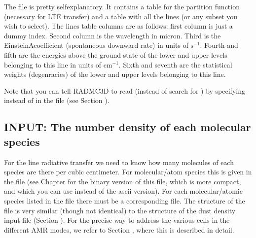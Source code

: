 \documentclass[letterpaper,10pt,english]{sphinxmanual}
\begin{document}
The file is pretty self\sphinxhyphen{}explanatory. It contains a table for the partition
function (necessary for LTE transfer) and a table with all the lines (or any
subset you wish to select). The lines table columns are as follows: first column
is just a dummy index. Second column is the wavelength in micron. Third is the
Einstein\sphinxhyphen{}A\sphinxhyphen{}coefficient (spontaneous downward rate) in units of
\(\mathrm{s}^{-1}\). Fourth and fifth are the energies above the ground state of
the lower and upper levels belonging to this line in units of
\(\mathrm{cm}^{-1}\). Sixth and seventh are the statistical weights (degenracies) of
the lower and upper levels belonging to this line.

Note that you can tell RADMC\sphinxhyphen{}3D to read  (instead of search
for ) by specifying  instead of  in
the  file (see Section {\hyperref[\detokenize{lineradtrans:sec-line-dot-inp}]{}}).


\subsection{INPUT: The number density of each molecular species}
\label{\detokenize{lineradtrans:input-the-number-density-of-each-molecular-species}}\label{\detokenize{lineradtrans:sec-mol-numdensity}}
For the line radiative transfer we need to know how many molecules of each
species are there per cubic centimeter. For molecular/atom species  this
is given in the file  (see Chapter {\hyperref[\detokenize{binaryio:chap-binary-io}]{}}
for the binary version of this file, which is more compact, and which you can
use instead of the ascii version). For each molecular/atomic species listed in
the  file there must be a corresponding 
file. The structure of the file is very similar (though not identical) to the
structure of the dust density input file  (Section
{\hyperref[\detokenize{inputoutputfiles:sec-dustdens}]{}}). For the precise way to address the various cells in the
different AMR modes, we refer to Section {\hyperref[\detokenize{inputoutputfiles:sec-dustdens}]{}}, where this is
described in detail.
\end{document}
